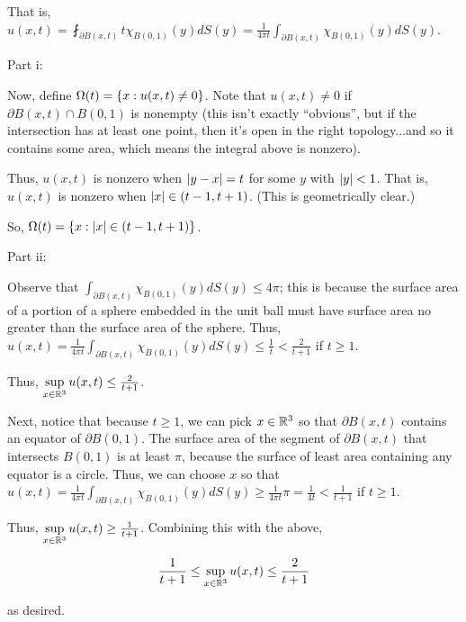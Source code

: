 \documentclass[a4paper,12pt]{article}
\begin{document}
That is, $u(x,t) = \fint_{\partial B(x,t)} t\chi_{B(0,1)}(y) dS(y) = \frac{1}{4\pi t} \int_{\partial B(x,t)} \chi_{B(0,1)}(y) dS(y)$.

Part i:

Now, define $\Omega(t) = \{x: u(x,t) \neq 0\}$. Note that $u(x,t) \neq 0$ if $\partial B(x,t) \cap B(0,1)$ is nonempty (this isn't exactly ``obvious'', but if the intersection has at least one point, then it's open in the right topology...and so it contains some area, which means the integral above is nonzero).

Thus, $u(x,t)$ is nonzero when $\left\lvert y-x \right\rvert =t$ for some $y$ with $\left\lvert y \right\rvert < 1$. That is, $u(x,t)$ is nonzero when $\left\lvert x \right\rvert \in (t-1,t+1)$. (This is geometrically clear.) %

So, $\Omega(t) = \{x: \left\lvert x \right\rvert \in (t-1,t+1)\}$. 

\shunt

Part ii:

Observe that $\int_{\partial B(x,t)} \chi_{B(0,1)}(y) dS(y) \leq 4\pi$; this is because the surface area of a portion of a sphere embedded in the unit ball must have surface area no greater than the surface area of the sphere. Thus, $u(x,t) = \frac{1}{4\pi t} \int_{\partial B(x,t)} \chi_{B(0,1)}(y) dS(y) \leq \frac{1}{t} < \frac{2}{t+1}$ if $t \geq 1$.

Thus, $\sup\limits_{x \in \mathbb{R}^3} u(x,t) \leq  \frac{2}{t+1}$. 

Next, notice that because $t\geq 1$, we can pick $x \in \mathbb{R}^3$ so that $\partial B(x,t)$ contains an equator of $\partial B(0,1)$. The surface area of the segment of $\partial B(x,t)$ that intersects $B(0,1)$ is at least $\pi$, because the surface of least area containing any equator is a circle. Thus, we can choose $x$ so that $u(x,t) = \frac{1}{4\pi t} \int_{\partial B(x,t)} \chi_{B(0,1)}(y) dS(y) \geq \frac{1}{4\pi t} \pi = \frac{1}{4t} < \frac{1}{t+1}$ if $t \geq 1$.

Thus, $\sup\limits_{x \in \mathbb{R}^3} u(x,t) \geq \frac{1}{t+1}$. Combining this with the above,

\begin{displaymath}
\frac{1}{t+1} \leq \sup\limits_{x \in \mathbb{R}^3} u(x,t) \leq  \frac{2}{t+1}
\end{displaymath}

as desired. 

\end{document}
